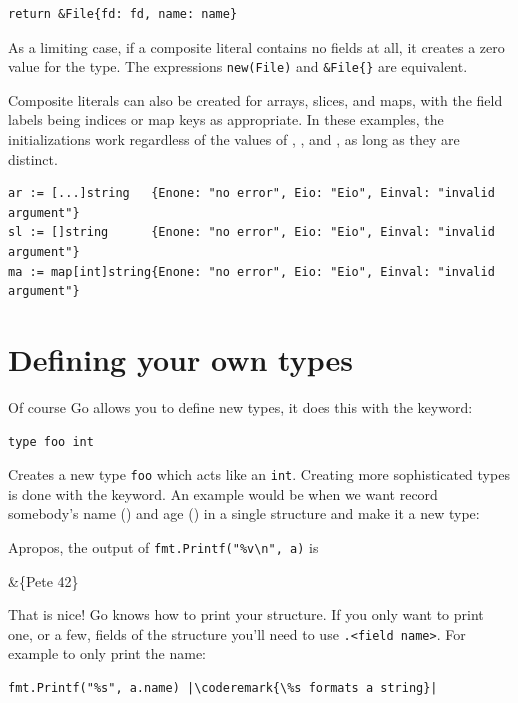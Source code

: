 \begin{lstlisting}
return &File{fd: fd, name: name}
\end{lstlisting}
As a limiting case, if a composite literal contains no fields at all, it
creates a zero value for the type. The expressions
\lstinline{new(File)} and 
\lstinline|&File{}| are equivalent.

Composite literals can also be created for arrays, slices, and maps,
with the field labels being indices or map keys as appropriate. In these
examples, the initializations work regardless of the values of
,
, and , as long as they are distinct.
\begin{lstlisting}
ar := [...]string   {Enone: "no error", Eio: "Eio", Einval: "invalid argument"}
sl := []string      {Enone: "no error", Eio: "Eio", Einval: "invalid argument"}
ma := map[int]string{Enone: "no error", Eio: "Eio", Einval: "invalid argument"}
\end{lstlisting}

\section{Defining your own types}
\label{sec:defining your own}
Of course Go allows you to define new types, it does this 
with the  keyword: 
\begin{lstlisting}
type foo int
\end{lstlisting}
Creates
a new type \lstinline{foo} which acts like an \lstinline{int}.
Creating more sophisticated types is done with the
keyword.
An example would be when we want record somebody's name ()
and age () in a single structure and make it a new type:

Apropos, the output of \lstinline{fmt.Printf("%v\n", a)} is 
\begin{display}
&\{Pete 42\}
\end{display}
That is nice!
Go knows how to print your structure. If you
only want to print one, or a few, fields of the structure you'll
need to use \verb|.<field name>|. For example to only print the name:
\begin{lstlisting}
fmt.Printf("%s", a.name) |\coderemark{\%s formats a string}|
\end{lstlisting}

